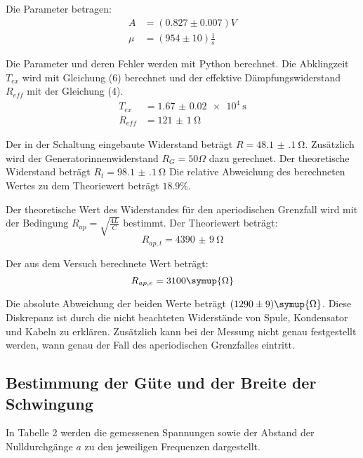 Die Parameter betragen:
\begin{align*}
  A &= (0.827 \pm 0.007)V \\
  \mu &= (954 \pm 10)\frac{1}{s}
\end{align*}

Die Parameter und deren Fehler werden mit Python berechnet.
Die Abklingzeit $T_{ex}$ wird mit Gleichung (6) berechnet und der effektive Dämpfungswiderstand $R_{eff}$ mit
der Gleichung (4).
\begin{align*}
T_{ex} &= \SI{1.67(2)e4}{\second} \\
R_{eff} &= \SI{121(1)}{\ohm}
\end{align*}

Der in der Schaltung eingebaute Widerstand beträgt $R = \SI{48.1(1)}{\ohm}$. Zusätzlich wird der
Generatorinnenwiderstand $R_G = 50 \Omega$ dazu gerechnet. Der theoretische Widerstand beträgt $R_t = \SI{98.1(1)}{\ohm}$
Die relative Abweichung des berechneten Wertes zu dem Theoriewert beträgt $18.9\%$.


Der theoretische Wert des Widerstandes für den aperiodischen Grenzfall wird mit der Bedingung
$R_{ap} =\sqrt{\frac{4L}{C}}$ bestimmt. Der Theoriewert beträgt:
\begin{equation*}
  R_{ap,t} = \SI{4390(9)}{\ohm}
\end{equation*}

Der aus dem Versuch berechnete Wert beträgt:
\begin{equation*}
  R_{ap,e} = 3100 \symup{\Omega}
\end{equation*}

Die absolute Abweichung der beiden Werte beträgt $(1290 \pm 9) \symup{\Omega}$.
Diese Diskrepanz ist durch die nicht beachteten Widerstände von Spule, Kondensator und Kabeln zu erklären. Zusätzlich
kann bei der Messung nicht genau festgestellt werden, wann genau der Fall des aperiodischen Grenzfalles eintritt.


\subsection{Bestimmung der Güte und der Breite der Schwingung}

In Tabelle 2 werden die gemessenen Spannungen sowie der Abstand der Nulldurchgänge $a$ zu den jeweiligen
Frequenzen dargestellt.

